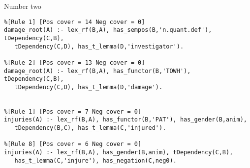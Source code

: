 \documentclass[xcolor=dvipsnames]{beamer}
\begin{document}
\begin{frame}[fragile]{Number two}
\begin{verbatim}
%[Rule 1] [Pos cover = 14 Neg cover = 0]
damage_root(A) :- lex_rf(B,A), has_sempos(B,'n.quant.def'), tDependency(C,B),
   tDependency(C,D), has_t_lemma(D,'investigator').

%[Rule 2] [Pos cover = 13 Neg cover = 0]
damage_root(A) :- lex_rf(B,A), has_functor(B,'TOWH'), tDependency(C,B),
   tDependency(C,D), has_t_lemma(D,'damage').


%[Rule 1] [Pos cover = 7 Neg cover = 0]
injuries(A) :- lex_rf(B,A), has_functor(B,'PAT'), has_gender(B,anim),
   tDependency(B,C), has_t_lemma(C,'injured').

%[Rule 8] [Pos cover = 6 Neg cover = 0]
injuries(A) :- lex_rf(B,A), has_gender(B,anim), tDependency(C,B),
   has_t_lemma(C,'injure'), has_negation(C,neg0).
\end{verbatim}
\end{frame}
\end{document}
